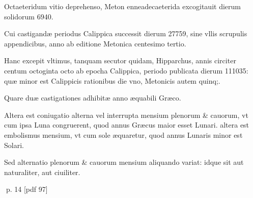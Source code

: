 \begin{parnumbers}
Octaeteridum vitio deprehenso, Meton enneadecaeterida excogitauit dierum solidorum 6940.

Cui castigandæ periodus Calippica successit dierum 27759, sine vllis scrupulis appendicibus, anno ab editione Metonica centesimo tertio.

Hanc excepit vltimus, tanquam secutor quidam,  Hipparchus, annis circiter centum octoginta octo ab epocha Calippica, periodo publicata dierum 111035: quæ minor est Calippicis rationibus die vno, Metonicis autem quinq;.

Quare duæ castigationes adhibitæ anno æquabili Græco.

Altera est coniugatio alterna vel interrupta mensium plenorum \& cauorum, vt cum ipsa Luna congruerent, quod annus Græcus maior esset Lunari. altera est embolismus mensium, vt cum sole æquaretur, quod annus Lunaris minor est Solari.

Sed alternatio plenorum \& cauorum mensium aliquando variat: idque sit aut naturaliter, aut ciuiliter.

\end{parnumbers}
\clearpage
p. 14 [pdf 97]


